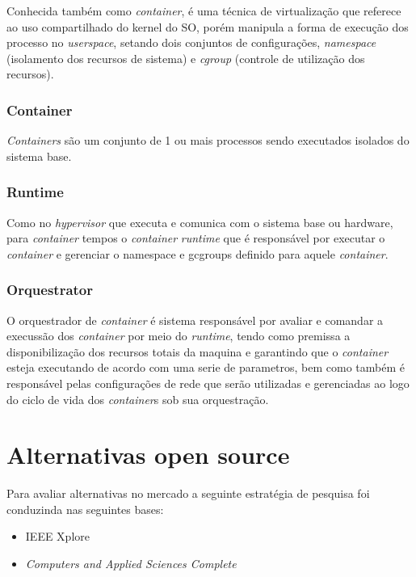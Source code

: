 Conhecida também como \emph{container}, é uma técnica de virtualização que referece ao uso compartilhado do kernel do SO, porém manipula a forma de execução dos processo no \emph{userspace}, setando dois conjuntos de configurações, \emph{namespace} (isolamento dos recursos de sistema) e \emph{cgroup} (controle de utilização dos recursos).

\cite{redhat2018}
\subsubsection{Container}
\emph{Containers} são um conjunto de 1 ou mais processos sendo executados isolados do sistema base.

\subsubsection{Runtime}
Como no \emph{hypervisor} que executa e comunica com o sistema base ou hardware, para \emph{container} tempos o \emph{container} \emph{runtime} que é responsável por executar o \emph{container} e gerenciar o namespace e gcgroups definido para aquele \emph{container}.

\subsubsection{Orquestrator}
O orquestrador de \emph{container} é sistema responsável por avaliar e comandar a execussão dos \emph{container} por meio do \emph{runtime}, tendo como premissa a disponibilização dos recursos totais da maquina e garantindo que o \emph{container} esteja executando de acordo com uma  serie de parametros, bem como também é responsável pelas configurações de rede que serão utilizadas e gerenciadas ao logo do ciclo de vida dos \emph{container}s sob sua orquestração.

\section{Alternativas open source}

Para avaliar alternativas no mercado a seguinte estratégia de pesquisa foi conduzinda nas seguintes bases:

\begin{itemize}
    \item IEEE Xplore
    \item \emph{Computers and Applied Sciences Complete}
\end{itemize}

